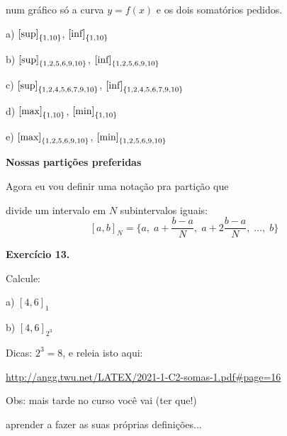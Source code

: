 \documentclass[oneside,12pt]{article}
\begin{document}
num gráfico só a curva $y=f(x)$ e os dois somatórios pedidos.

a) $\text{[sup]}_{\{1,10\}}$, 
   $\text{[inf]}_{\{1,10\}}$

\ssk

b) $\text{[sup]}_{\{1,2,5,6,9,10\}}$, 
   $\text{[inf]}_{\{1,2,5,6,9,10\}}$

\ssk

c) $\text{[sup]}_{\{1,2,4,5,6,7,9,10\}}$, 
   $\text{[inf]}_{\{1,2,4,5,6,7,9,10\}}$

\bsk

d) $\text{[max]}_{\{1,10\}}$, 
   $\text{[min]}_{\{1,10\}}$

\ssk

e) $\text{[max]}_{\{1,2,5,6,9,10\}}$, 
   $\text{[min]}_{\{1,2,5,6,9,10\}}$



\newpage


{\bf Nossas partições preferidas}

Agora eu vou definir uma notação pra partição que

divide um intervalo em $N$ subintervalos iguais:
%
\def\baN{\frac{b-a}{N}}
%
$$
  \textstyle
  [a,b]_N = \{a, \; a+\baN, \; a+2\baN, \; \ldots, \; b\}
$$

\msk

{\bf Exercício 13.}

Calcule:

a) $[4,6]_1$

b) $[4,6]_{2^3}$

\msk

Dicas: $2^3=8$, e releia isto aqui:

\ssk

{\footnotesize

\url{http://angg.twu.net/LATEX/2021-1-C2-somas-1.pdf\#page=16}

}

\bsk


Obs: mais tarde no curso você vai (ter que!)

aprender a fazer as suas próprias definições...

\newpage

\end{document}

